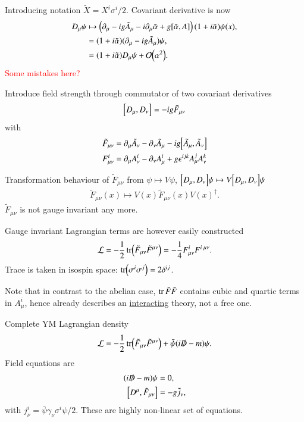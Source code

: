 Introducing notation $\tilde{X} = X^i \sigma^i / 2$.
Covariant derivative is now  
\begin{align}
   D_\mu \psi &\mapsto \left( \partial_\mu - ig \tilde{A}_\mu - i \partial_\mu \tilde{\alpha} + g \comm{\tilde{\alpha}}{A} \right) (1 + i \tilde{\alpha}) \psi(x), \notag \\
              &= (1 + i \tilde{\alpha}) (\partial_\mu - ig \tilde{A}_\mu) \psi, \notag \\
              &= (1+ i\tilde{\alpha}) D_\mu \psi + \order{\alpha^2}.
\end{align}
\textcolor{red}{Some mistakes here?}

Introduce field strength through  commutator of two covariant derivatives
\begin{align}
   \comm{D_\mu}{D_\nu} = -ig \tilde{F}_{\mu\nu}
\end{align}
with
\begin{align}
   \tilde{F}_{\mu\nu} &= \partial_\mu \tilde{A}_\nu - \partial_\nu \tilde{A}_\mu - ig \comm{\tilde{A}_\mu}{\tilde{A}_\nu} \\
   F_{\mu\nu}^i &= \partial_\mu A_\nu^i - \partial_\nu A_\mu^i + g \epsilon^{ijk} A^j_\mu A^k_\nu
\end{align} 

Transformation behaviour of $\tilde{F}_{\mu\nu}$ from $\psi \mapsto V\psi$, $\comm{D_\mu}{D_\nu} \psi \mapsto V \comm{D_\mu}{D_\nu} \psi$
\begin{align*}
   \tilde{F}_{\mu\nu}(x) \mapsto V(x) \tilde{F}_{\mu\nu}(x) V(x)^\dagger.
\end{align*}
$\tilde{F}_{\mu\nu}$ is not gauge invariant any more.

Gauge invariant Lagrangian terms are however easily constructed
\begin{align}
   \mathcal{L} = -\frac{1}{2} \tr (\tilde{F}_{\mu\nu} \tilde{F}^{\mu\nu}) =  -\frac{1}{4} F^i_{\mu\nu} F^{i \; \mu\nu}.
\end{align}
Trace is taken in isospin space: $\tr(\sigma^i \sigma^j) = 2\delta^{ij}$.

Note that in contrast to the abelian case, $\tr \tilde{F}\tilde{F}$ contains cubic and quartic terms in $A_\mu^i$, hence already describes an \underline{interacting} theory, not a free one.

Complete YM Lagrangian density
\begin{align}
   \mathcal{L} = - \frac{1}{2} \tr (\tilde{F}_{\mu\nu} \tilde{F}^{\mu\nu}) + \bar\psi ( i \slashed{D} - m) \psi.
\end{align}
Field equations are 
\begin{align*}
   (i\slashed{D} - m) \psi  &= 0, \\
   \comm{D^\mu}{\tilde{F}_{\mu\nu}} &= -g \tilde{j}_\nu,
\end{align*}
with $j_\nu^i = \bar\psi \gamma_\nu \sigma^i \psi / 2$. These are highly non-linear set of equations.

